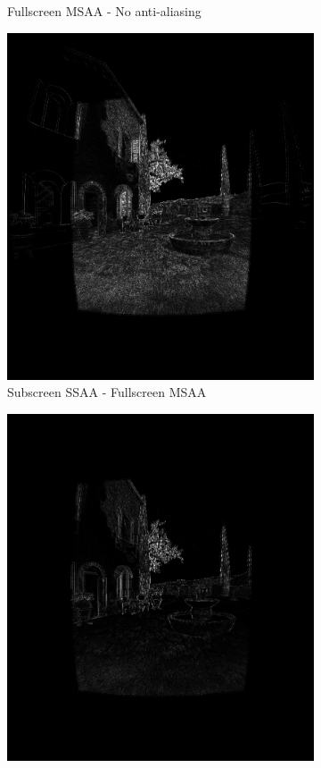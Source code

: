 \documentclass[12pt,a4paper,twoside,openright]{report}
\begin{document}
\begin{figure}[tbh]
\begin{subfigure}{0.5\textwidth}
\caption{Fullscreen MSAA - No anti-aliasing}
\end{subfigure}
\begin{subfigure}{0.5\textwidth}
\includegraphics[width=1.0\linewidth]{figs/ssaaminusmsaa.png}
\caption{Subscreen SSAA - Fullscreen MSAA}
\end{subfigure}
\begin{subfigure}{0.5\textwidth}
\includegraphics[width=1.0\linewidth]{figs/fullscreenminussubscreenmsaa.png} 

\end{subfigure}
\end{figure}
\end{document}
